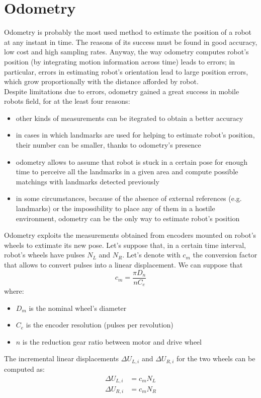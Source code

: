 \documentclass[a4paper, onecolumn]{report}
\begin{document}
\section{Odometry}
Odometry is probably the most used method to estimate the position of a robot at any instant in time. The reasons of its success must be found in good accuracy, low cost and high sampling rates. Anyway, the way odometry computes robot's position (by integrating motion information across time) leads to errors; in particular, errors in estimating robot's orientation lead to large position errors, which grow proportionally with the distance afforded by robot. \\
Despite limitations due to errors, odometry gained a great success in mobile robots field, for at the least four reasons:
\begin{itemize}
\item{other kinds of measurements can be itegrated to obtain a better accuracy}
\item{in cases in which landmarks are used for helping to estimate robot's position, their number can be smaller, thanks to odometry's presence}
\item{odometry allows to assume that robot is stuck in a certain pose for enough time to perceive all the landmarks in a given area and compute possible matchings with landmarks detected previously}
\item{in some circumstances, because of the absence of external references (e.g. landmarks) or the impossibility to place any of them in a hostile environment, odometry can be the only way to estimate robot's position}
\end{itemize}
Odometry exploits the measurements obtained from encoders mounted on robot's wheels to extimate its new pose. Let's suppose that, in a certain time interval, robot's wheels have pulses $N_L$ and $N_R$. Let's denote with $c_m$ the conversion factor that allows to convert pulses into a linear displacement. We can suppose that
\begin{equation}
	c_m = \frac{\pi D_n}{nC_e}
\end{equation}
where:
\begin{itemize}
\item{$D_m$ is the nominal wheel's diameter}
\item{$C_e$ is the encoder resolution (pulses per revolution)}
\item{$n$ is the reduction gear ratio between motor and drive wheel}
\end{itemize}
The incremental linear displacements $\Delta U_{L,i}$ and $\Delta U_{R,i}$ for the two wheels can be computed as:
\begin{equation}
	\begin{aligned}
		\Delta U_{L,i} &= c_m N_L \\
		\Delta U_{R,i} &= c_m N_R
	\end{aligned}
\end{equation}
\end{document}
